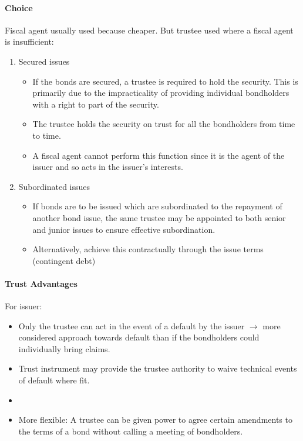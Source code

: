 \documentclass[
]{article}
\providecommand{\tightlist}{%
  \setlength{\itemsep}{0pt}\setlength{\parskip}{0pt}}
\begin{document}
\hypertarget{choice}{%
\paragraph{Choice}\label{choice}}

Fiscal agent usually used because cheaper. But trustee used where a
fiscal agent is insufficient:

\begin{enumerate}
\def\labelenumi{\arabic{enumi}.}
\tightlist
\item
  Secured issues

  \begin{itemize}
  \tightlist
  \item
    If the bonds are secured, a trustee is required to hold the
    security. This is primarily due to the impracticality of providing
    individual bondholders with a right to part of the security.
  \item
    The trustee holds the security on trust for all the bondholders from
    time to time.
  \item
    A fiscal agent cannot perform this function since it is the agent of
    the issuer and so acts in the issuer's interests.
  \end{itemize}
\item
  Subordinated issues

  \begin{itemize}
  \tightlist
  \item
    If bonds are to be issued which are subordinated to the repayment of
    another bond issue, the same trustee may be appointed to both senior
    and junior issues to ensure effective subordination.
  \item
    Alternatively, achieve this contractually through the issue terms
    (contingent debt)
  \end{itemize}
\end{enumerate}

\hypertarget{trust-advantages}{%
\paragraph{Trust Advantages}\label{trust-advantages}}

For issuer:

\begin{itemize}
\tightlist
\item
  Only the trustee can act in the event of a default by the issuer
  \(\rightarrow\) more considered approach towards default than if the
  bondholders could individually bring claims.
\item
  Trust instrument may provide the trustee authority to waive technical
  events of default where fit.
\item
\item
  More flexible: A trustee can be given power to agree certain
  amendments to the terms of a bond without calling a meeting of
  bondholders.
\end{itemize}
\end{document}
